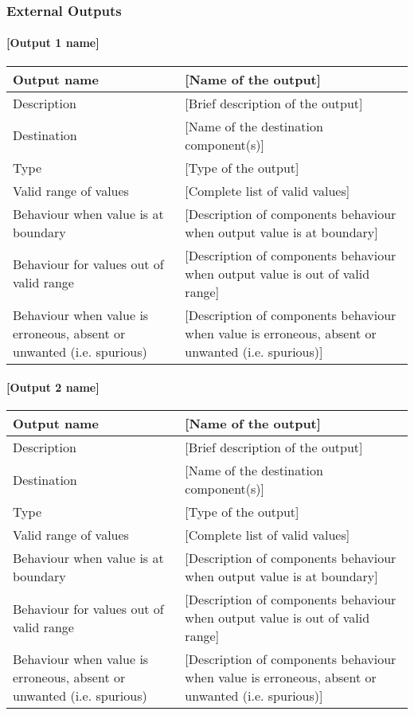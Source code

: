 \subsubsection{External Outputs}

\paragraph{[Output 1 name]}

\begin{longtable}{p{}p{}}
\toprule
Output name				& [Name of the output] \\
\midrule
Description				& [Brief description of the output] \\
\midrule
Destination				& [Name of the destination component(s)] \\ 
\midrule
Type					& [Type of the output] \\
\midrule
Valid range of values	& [Complete list of valid values] \\
\midrule
Behaviour when value is at boundary	& [Description of components behaviour when output value is at boundary] \\
\midrule
Behaviour for values out of valid range	& [Description of components behaviour when output value is out of valid range] \\
\midrule
Behaviour when value is erroneous, absent or unwanted (i.e. spurious) & [Description of components behaviour when value is erroneous, absent or unwanted (i.e. spurious)] \\
\bottomrule
\end{longtable}


\paragraph{[Output 2 name]}

\begin{longtable}{p{}p{}}
\toprule
Output name				& [Name of the output] \\
\midrule
Description				& [Brief description of the output] \\
\midrule
Destination				& [Name of the destination component(s)] \\ 
\midrule
Type					& [Type of the output] \\
\midrule
Valid range of values	& [Complete list of valid values] \\
\midrule
Behaviour when value is at boundary	& [Description of components behaviour when output value is at boundary] \\
\midrule
Behaviour for values out of valid range	& [Description of components behaviour when output value is out of valid range] \\
\midrule
Behaviour when value is erroneous, absent or unwanted (i.e. spurious) & [Description of components behaviour when value is erroneous, absent or unwanted (i.e. spurious)] \\
\bottomrule
\end{longtable}
